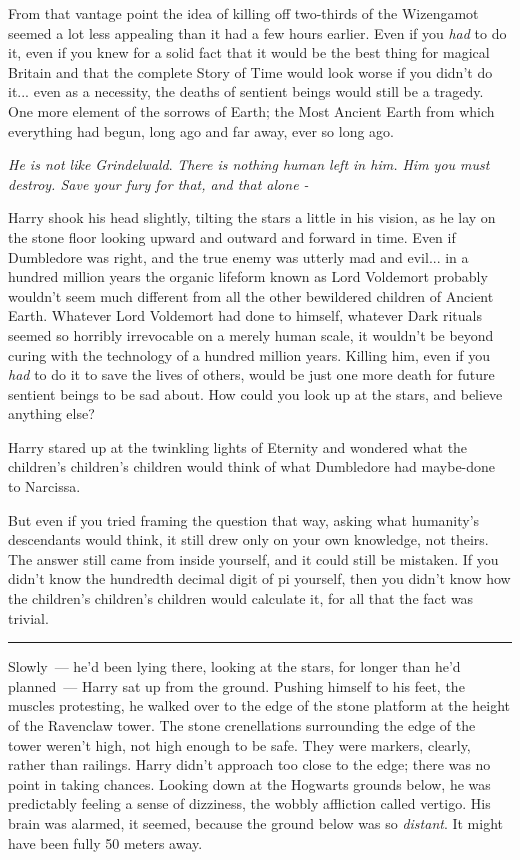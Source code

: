 From that vantage point the idea of killing off two-thirds of the Wizengamot seemed a lot less appealing than it had a few hours earlier. Even if you \emph{had} to do it, even if you knew for a solid fact that it would be the best thing for magical Britain and that the complete Story of Time would look worse if you didn't do it... even as a necessity, the deaths of sentient beings would still be a tragedy. One more element of the sorrows of Earth; the Most Ancient Earth from which everything had begun, long ago and far away, ever so long ago.

\emph{He is not like Grindelwald}. \emph{There is nothing human left in him. Him you must destroy. Save your fury for that, and that alone -}

Harry shook his head slightly, tilting the stars a little in his vision, as he lay on the stone floor looking upward and outward and forward in time. Even if Dumbledore was right, and the true enemy was utterly mad and evil... in a hundred million years the organic lifeform known as Lord Voldemort probably wouldn't seem much different from all the other bewildered children of Ancient Earth. Whatever Lord Voldemort had done to himself, whatever Dark rituals seemed so horribly irrevocable on a merely human scale, it wouldn't be beyond curing with the technology of a hundred million years. Killing him, even if you \emph{had} to do it to save the lives of others, would be just one more death for future sentient beings to be sad about. How could you look up at the stars, and believe anything else?

Harry stared up at the twinkling lights of Eternity and wondered what the children's children's children would think of what Dumbledore had maybe-done to Narcissa.

But even if you tried framing the question that way, asking what humanity's descendants would think, it still drew only on your own knowledge, not theirs. The answer still came from inside yourself, and it could still be mistaken. If you didn't know the hundredth decimal digit of pi yourself, then you didn't know how the children's children's children would calculate it, for all that the fact was trivial.

\begin{center}\rule{3in}{0.4pt}\end{center}

Slowly~--- he'd been lying there, looking at the stars, for longer than he'd planned~--- Harry sat up from the ground. Pushing himself to his feet, the muscles protesting, he walked over to the edge of the stone platform at the height of the Ravenclaw tower. The stone crenellations surrounding the edge of the tower weren't high, not high enough to be safe. They were markers, clearly, rather than railings. Harry didn't approach too close to the edge; there was no point in taking chances. Looking down at the Hogwarts grounds below, he was predictably feeling a sense of dizziness, the wobbly affliction called vertigo. His brain was alarmed, it seemed, because the ground below was so \emph{distant}. It might have been fully 50 meters away.

